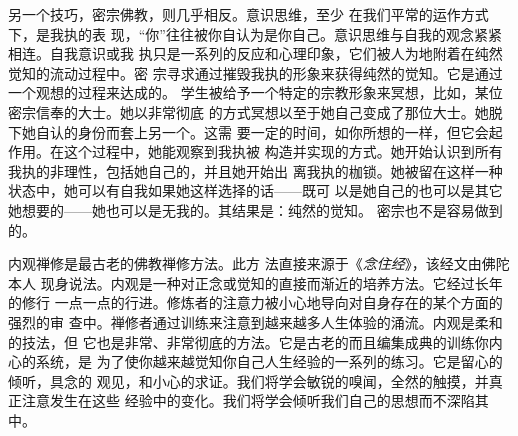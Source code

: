 另一个技巧，密宗佛教，则几乎相反。意识思维，至少
在我们平常的运作方式下，是我执的表
现，“你”往往被你自认为是你自己。意识思维与自我的观念紧紧相连。自我意识或我
执只是一系列的反应和心理印象，它们被人为地附着在纯然觉知的流动过程中。\1密
宗寻求通过摧毁我执的形象来获得纯然的觉知。它是通过一个观想的过程来达成的。
学生被给予一个特定的宗教形象来冥想，比如，某位密宗信奉的大士。她以非常彻底
的方式冥想以至于她自己变成了那位大士。她脱下她自认的身份而套上另一个。这需
要一定的时间，如你所想的一样，但它会起作用。在这个过程中，她能观察到我执被
构造并实现的方式。她开始认识到所有我执的非理性，包括她自己的，并且她开始出
离我执的枷锁。她被留在这样一种状态中，她可以有自我如果她这样选择的话——既可
以是她自己的也可以是其它她想要的——她也可以是无我的。其结果是：纯然的觉知。
密宗也不是容易做到的。

内观禅修是最古老的佛教禅修方法。此方
法直接来源于《{\it 念住经}》，该经文由佛陀本人
现身说法。内观是一种对正念或觉知的直接而渐近的培养方法。它经过长年的修行
一点一点的行进。修炼者的注意力被小心地导向对自身存在的某个方面的强烈的审
查中。禅修者通过训练来注意到越来越多人生体验的涌流。内观是柔和的技法，但
它也是非常、非常彻底的方法。它是古老的而且编集成典的训练你内心的系统，是
为了使你越来越觉知你自己人生经验的一系列的练习。它是留心的倾听，具念的
观见，和小心的求证。我们将学会敏锐的嗅闻，全然的触摸，并真正注意发生在这些
经验中的变化。我们将学会倾听我们自己的思想而不深陷其中。

\endchapter

\byebye
